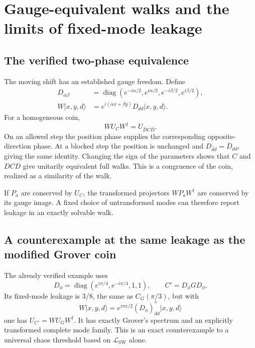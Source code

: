\documentclass[11pt,a4paper,oneside]{report}
\newcommand{\ket}[1]{\lvert #1\rangle}
\newcommand{\diag}{\operatorname{diag}}
\newcommand{\sw}{\mathrm{SW}}
\numberwithin{equation}{chapter}
\begin{document}
\appendix
\chapter{Gauge-equivalent walks and the limits of fixed-mode leakage}
\label{app:gauge}

\section{The verified two-phase equivalence}

The moving shift has an established gauge freedom. Define
\begin{align}
D_{\alpha\beta}
&=\diag(e^{-i\alpha/2},e^{i\alpha/2},
e^{-i\beta/2},e^{i\beta/2}),\\
W\ket{x,y,d}&=e^{i(\alpha x+\beta y)}D_{dd}\ket{x,y,d}.
\end{align}
For a homogeneous coin,
\begin{equation}
\boxed{W U_C W^\dagger=U_{\bar D C\bar D}.}
\label{eq:gauge}
\end{equation}
On an allowed step the position phase supplies the corresponding
opposite-direction phase. At a blocked step the position is unchanged
and \(D_{\bar d\bar d}=\bar D_{dd}\), giving the same identity.
Changing the sign of the parameters shows that \(C\) and \(DCD\)
give unitarily equivalent full walks. This is a congruence of the
coin, realized as a similarity of the walk.

If \(P_a\) are conserved by \(U_C\), the transformed projectors
\(WP_aW^\dagger\) are conserved by its gauge image. A fixed choice
of untransformed modes can therefore report leakage in an exactly
solvable walk.

\section{A counterexample at the same leakage as the modified Grover coin}

The already verified example uses
\begin{equation}
D_\phi=\diag(e^{i\pi/4},e^{-i\pi/4},1,1),\qquad
C'=D_\phi G D_\phi.
\end{equation}
Its fixed-mode leakage is \(3/8\), the same as \(C_G(\pi/3)\),
but with
\begin{equation}
W\ket{x,y,d}=e^{i\pi x/2}(D_\phi)^*_{dd}\ket{x,y,d}
\end{equation}
one has \(U_{C'}=WU_GW^\dagger\). It has exactly Grover's spectrum
and an explicitly transformed complete mode family. This is an exact
counterexample to a universal chaos threshold based on
\(\mathcal L_{\sw}\) alone.
\end{document}
